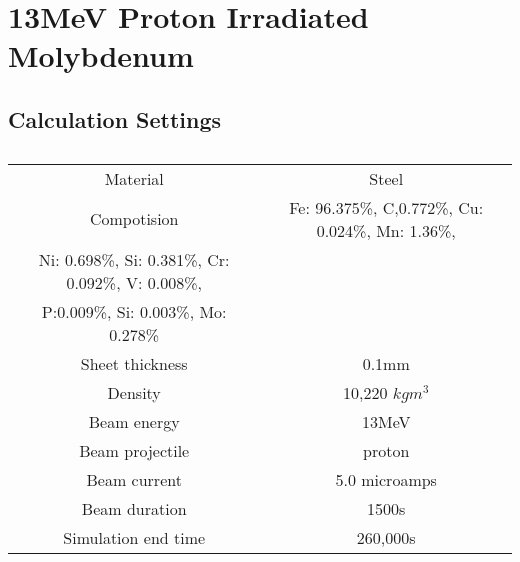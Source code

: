 \FloatBarrier
\clearpage
\section{13MeV Proton Irradiated Molybdenum}
\label{appendix:alexsteel}

\subsection{Calculation Settings}

\begin{table}[h]
\begin{center}
\begin{tabular}{c c}
\hline\hline
Material & Steel \\
Compotision & Fe: 96.375\%, C,0.772\%, Cu: 0.024\%, Mn: 1.36\%, \\Ni: 0.698\%, Si: 0.381\%, Cr: 0.092\%, V: 0.008\%, \\P:0.009\%, Si: 0.003\%, Mo: 0.278\% \\
Sheet thickness & 0.1mm \\
Density & 10,220 $kg m^{3}$ \\
Beam energy & 13MeV \\
Beam projectile & proton \\
Beam current & 5.0 microamps \\
Beam duration & 1500s \\
Simulation end time & 260,000s \\
\hline\hline
\end{tabular}
\end{center}
\caption{}
\label{table:appendixironsettings}
\end{table}








